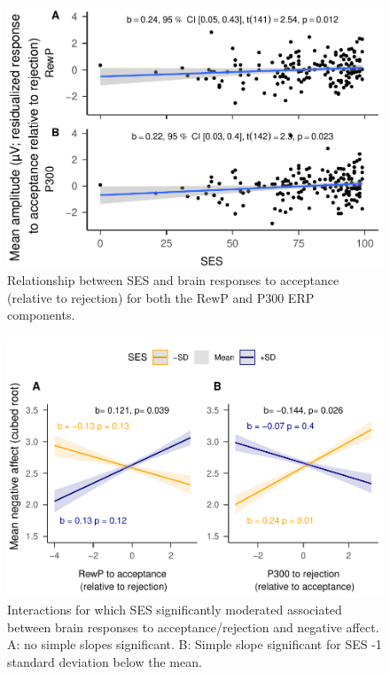 \documentclass[
  man,floatsintext]{apa7}
\begin{document}
\begin{figure}
\centering
\includegraphics{BUDS_tables_and_figures_working_files/figure-latex/unnamed-chunk-10-1.pdf}
\caption{\label{fig:unnamed-chunk-10}Relationship between SES and brain responses to acceptance (relative to rejection) for both the RewP and P300 ERP components.}
\end{figure}

\begin{figure}
\centering
\includegraphics{BUDS_tables_and_figures_working_files/figure-latex/unnamed-chunk-14-1.pdf}
\caption{\label{fig:unnamed-chunk-14}Interactions for which SES significantly moderated associated between brain responses to acceptance/rejection and negative affect. A: no simple slopes significant. B: Simple slope significant for SES -1 standard deviation below the mean.}
\end{figure}
\end{document}
